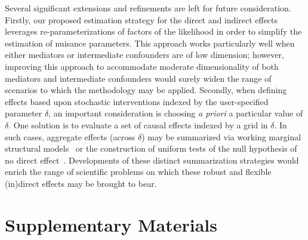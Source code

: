 Several significant extensions and refinements are left for future
consideration. Firstly, our proposed estimation strategy for the direct and
indirect effects leverages re-parameterizations of factors of the likelihood in
order to simplify the estimation of nuisance parameters. This approach works
particularly well when either mediators or intermediate confounders are of low
dimension; however, improving this approach to accommodate moderate
dimensionality of both mediators and intermediate confounders would surely widen
the range of scenarios to which the methodology may be applied. Secondly, when
defining effects based upon stochastic interventions indexed by the
user-specified parameter $\delta$, an important consideration is choosing
\textit{a priori} a particular value of $\delta$. One solution is to evaluate
a set of causal effects indexed by a grid in $\delta$. In such cases, aggregate
effects (across $\delta$) may be summarized via working marginal structural
models~\citep[e.g.,][]{hejazi2020efficient} or the construction of uniform tests
of the null hypothesis of no direct effect~\citep[e.g.,][]{diaz2020causal}.
Developments of these distinct summarization strategies would enrich the range
of scientific problems on which these robust and flexible (in)direct effects may
be brought to bear.

\section{Supplementary Materials}\label{sm}

